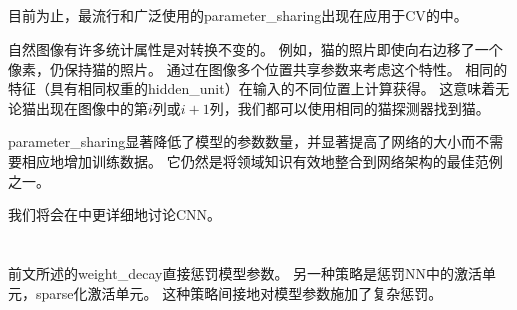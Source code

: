 \subsection{}
目前为止，最流行和广泛使用的\gls{parameter_sharing}出现在应用于\gls{CV}的中。

自然图像有许多统计属性是对转换不变的。
例如，猫的照片即使向右边移了一个像素，仍保持猫的照片。
通过在图像多个位置共享参数来考虑这个特性。
相同的特征（具有相同权重的\gls{hidden_unit}）在输入的不同位置上计算获得。
这意味着无论猫出现在图像中的第$i$列或$i + 1$列，我们都可以使用相同的猫探测器找到猫。

\gls{parameter_sharing}显著降低了模型的参数数量，并显著提高了网络的大小而不需要相应地增加训练数据。
它仍然是将领域知识有效地整合到网络架构的最佳范例之一。

我们将会在中更详细地讨论\gls{CNN}。

\section{}
\label{sec:sparse_representations}
前文所述的\gls{weight_decay}直接惩罚模型参数。
另一种策略是惩罚\gls{NN}中的激活单元，\gls{sparse}化激活单元。
这种策略间接地对模型参数施加了复杂惩罚。

